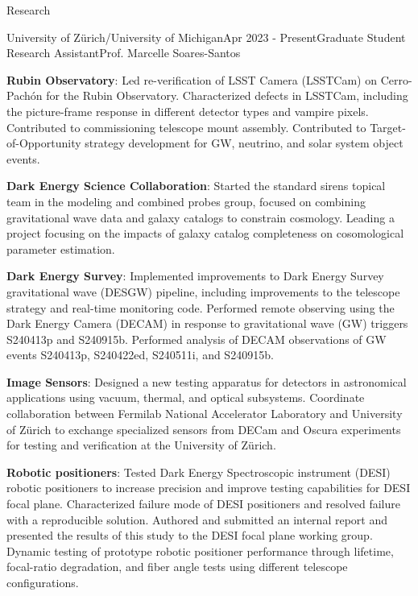 \documentclass{resume} %
\begin{document}
\begin{rSection}{Research}

\begin{rSubsection}{University of Zürich/University of Michigan}{Apr 2023 - Present}{Graduate Student Research Assistant}{Prof. Marcelle Soares-Santos}

    \item \textbf{Rubin Observatory}: Led re-verification of LSST Camera (LSSTCam) on Cerro-Pachón for the Rubin Observatory. Characterized defects in LSSTCam, including the picture-frame response in different detector types and vampire pixels. Contributed to commissioning telescope mount assembly. Contributed to Target-of-Opportunity strategy development for GW, neutrino, and solar system object events. 
    \item \textbf{Dark Energy Science Collaboration}: Started the standard sirens topical team in the modeling and combined probes group, focused on combining gravitational wave data and galaxy catalogs to constrain cosmology. Leading a project focusing on the impacts of galaxy catalog completeness on cosomological parameter estimation.
     \item \textbf{Dark Energy Survey}: Implemented improvements to Dark Energy Survey gravitational wave (DESGW) pipeline, including improvements to the telescope strategy and real-time monitoring code. Performed remote observing using the Dark Energy Camera (DECAM) in response to gravitational wave (GW) triggers S240413p and S240915b. Performed analysis of DECAM observations of GW events S240413p, S240422ed, S240511i, and S240915b.
   \item \textbf{Image Sensors}: Designed a new testing apparatus for detectors in astronomical applications using vacuum, thermal, and optical subsystems. Coordinate collaboration between Fermilab National Accelerator Laboratory and University of Zürich to exchange specialized sensors from DECam and Oscura experiments for testing and verification at the University of Zürich. 
    \item \textbf{Robotic positioners}: Tested Dark Energy Spectroscopic instrument (DESI) robotic positioners to increase precision and improve testing capabilities for DESI focal plane. Characterized failure mode of DESI positioners and resolved failure with a reproducible solution. Authored and submitted an internal report and presented the results of this study to the DESI focal plane working group. Dynamic testing of prototype robotic positioner performance through lifetime, focal-ratio degradation, and fiber angle tests using different telescope configurations.

\end{rSubsection}
\end{rSection}
\end{document}
